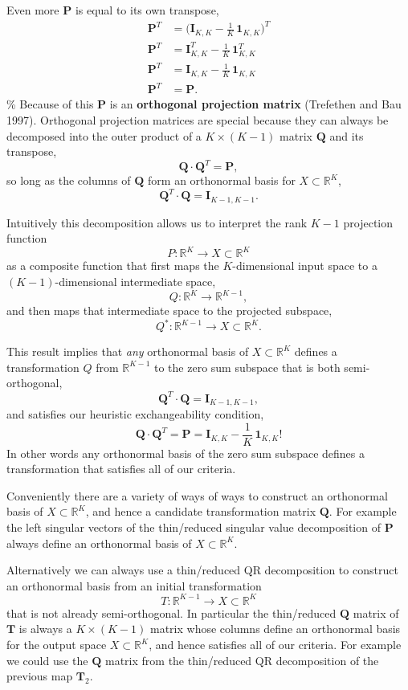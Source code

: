 \documentclass[
  letterpaper,
  DIV=11,
  numbers=noendperiod]{scrartcl}
\begin{document}
Even more \(\mathbf{P}\) is equal to its own transpose, \begin{align*}
\mathbf{P}^{T}
&=
\bigg( \mathbf{I}_{K, K} - \frac{1}{K} \, \mathbf{1}_{K, K} \bigg)^{T}
\\
\mathbf{P}^{T}
&=
\mathbf{I}_{K, K}^{T} - \frac{1}{K} \, \mathbf{1}_{K, K}^{T}
\\
\mathbf{P}^{T}
&=
\mathbf{I}_{K, K} - \frac{1}{K} \, \mathbf{1}_{K, K}
\\
\mathbf{P}^{T}
&=
\mathbf{P}.
\end{align*} \% Because of this \(\mathbf{P}\) is an \textbf{orthogonal
projection matrix} (Trefethen and Bau 1997). Orthogonal projection
matrices are special because they can always be decomposed into the
outer product of a \(K \times (K - 1)\) matrix \(\mathbf{Q}\) and its
transpose, \[
\mathbf{Q} \cdot \mathbf{Q}^{T} = \mathbf{P},
\] so long as the columns of \(\mathbf{Q}\) form an orthonormal basis
for \(X \subset \mathbb{R}^{K}\), \[
\mathbf{Q}^{T} \cdot \mathbf{Q} = \mathbf{I}_{K - 1, K - 1}.
\]

Intuitively this decomposition allows us to interpret the rank \(K - 1\)
projection function \[
P : \mathbb{R}^{K} \rightarrow X \subset \mathbb{R}^{K}
\] as a composite function that first maps the \(K\)-dimensional input
space to a \((K - 1)\)-dimensional intermediate space, \[
Q : \mathbb{R}^{K} \rightarrow \mathbb{R}^{K - 1},
\] and then maps that intermediate space to the projected subspace, \[
Q^{*} : \mathbb{R}^{K - 1} \rightarrow X \subset \mathbb{R}^{K}.
\]

This result implies that \emph{any} orthonormal basis of
\(X \subset \mathbb{R}^{K}\) defines a transformation \(Q\) from
\(\mathbb{R}^{K - 1}\) to the zero sum subspace that is both
semi-orthogonal, \[
\mathbf{Q}^{T} \cdot \mathbf{Q} = \mathbf{I}_{K - 1, K - 1},
\] and satisfies our heuristic exchangeability condition, \[
\mathbf{Q} \cdot \mathbf{Q}^{T}
=
\mathbf{P}
=
\mathbf{I}_{K, K} - \frac{1}{K} \, \mathbf{1}_{K, K}!
\] In other words any orthonormal basis of the zero sum subspace defines
a transformation that satisfies all of our criteria.

Conveniently there are a variety of ways of ways to construct an
orthonormal basis of \(X \subset \mathbb{R}^{K}\), and hence a candidate
transformation matrix \(\mathbf{Q}\). For example the left singular
vectors of the thin/reduced singular value decomposition of
\(\mathbf{P}\) always define an orthonormal basis of
\(X \subset \mathbb{R}^{K}\).

Alternatively we can always use a thin/reduced QR decomposition to
construct an orthonormal basis from an initial transformation \[
T : \mathbb{R}^{K - 1} \rightarrow X \subset \mathbb{R}^{K}
\] that is not already semi-orthogonal. In particular the thin/reduced
\(\mathbf{Q}\) matrix of \(\mathbf{T}\) is always a \(K \times (K - 1)\)
matrix whose columns define an orthonormal basis for the output space
\(X \subset \mathbb{R}^{K}\), and hence satisfies all of our criteria.
For example we could use the \(\mathbf{Q}\) matrix from the thin/reduced
QR decomposition of the previous map \(\mathbf{T}_{2}\).
\end{document}

